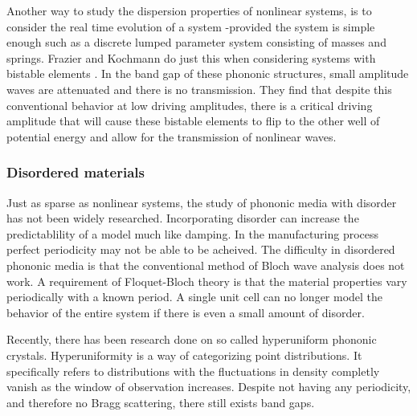 \documentclass{article}
\begin{document}
Another way to study the dispersion properties of nonlinear systems, is to 
consider the real time evolution of a system -provided the system is 
simple enough such as a discrete lumped parameter system consisting of masses 
and springs. Frazier and Kochmann do just this when considering systems with 
bistable elements \cite{frazier16}. In the band gap of these phononic 
structures, small 
amplitude waves are attenuated and there is no transmission. They find that 
despite this conventional behavior at low driving amplitudes, there is a 
critical driving amplitude that will cause these bistable elements to flip to 
the other well of potential energy and allow for the transmission of nonlinear 
waves.


\subsubsection{Disordered materials}
Just as sparse as nonlinear systems, the study of phononic media with disorder 
has not been widely researched. Incorporating disorder can increase the 
predictablility of a model much like damping. In the manufacturing process 
perfect periodicity may not be able to be acheived. The difficulty in 
disordered phononic media is that the conventional method of Bloch wave 
analysis does not work. A requirement of Floquet-Bloch theory is that the 
material properties vary periodically with a known period. A single unit cell 
can no longer model the behavior of the entire system if there is even a small 
amount of disorder.

Recently, there has been research done on so called hyperuniform phononic 
crystals. Hyperuniformity is a way of categorizing point distributions. It 
specifically refers to distributions with the fluctuations in density completly 
vanish as the window of observation increases. Despite not having any 
periodicity, and therefore no Bragg scattering, there still exists band gaps.
\end{document}
